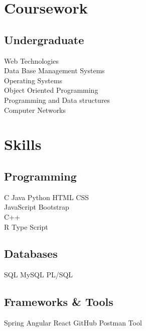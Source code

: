 \documentclass[]{deedy-resume-openfont}
\begin{document}
\begin{minipage}[t]{0.33\textwidth}

\section{Coursework}

\subsection{Undergraduate}
 \textbullet{} Web Technologies \\
 \textbullet{} Data Base Management Systems \\
 \textbullet{} Operating Systems \\
 \textbullet{} Object Oriented Programming \\
 \textbullet{} Programming and Data structures \\
  \textbullet{} Computer Networks
 


\section{Skills}
\subsection{Programming}
C \textbullet{}   Java \textbullet{} Python \textbullet{} HTML \textbullet{} CSS \\
JavaScript \textbullet{} Bootstrap  \\ 
\textbullet{}C++ \\\textbullet{} R \textbullet{} Type Script \\
\sectionsep

\subsection{Databases}
SQL  \textbullet{} MySQL \textbullet{} PL/SQL \\
\sectionsep

\subsection{Frameworks \& Tools}
\textbullet{}Spring \textbullet{} Angular \textbullet{} React \textbullet{} GitHub \textbullet{}Postman Tool


\end{minipage}
\end{document}
